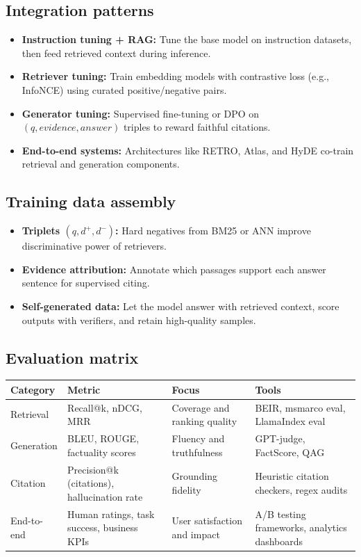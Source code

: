 \documentclass{article}
\begin{document}
\subsection{Integration patterns}
\begin{itemize}
  \item \textbf{Instruction tuning + RAG:} Tune the base model on instruction datasets, then feed retrieved context during inference.
  \item \textbf{Retriever tuning:} Train embedding models with contrastive loss (e.g., InfoNCE) using curated positive/negative pairs.
  \item \textbf{Generator tuning:} Supervised fine-tuning or DPO on $(q, evidence, answer)$ triples to reward faithful citations.
  \item \textbf{End-to-end systems:} Architectures like RETRO, Atlas, and HyDE co-train retrieval and generation components.
\end{itemize}

\subsection{Training data assembly}
\begin{itemize}
  \item \textbf{Triplets $(q, d^+, d^-)$:} Hard negatives from BM25 or ANN improve discriminative power of retrievers.
  \item \textbf{Evidence attribution:} Annotate which passages support each answer sentence for supervised citing.
  \item \textbf{Self-generated data:} Let the model answer with retrieved context, score outputs with verifiers, and retain high-quality samples.
\end{itemize}

\subsection{Evaluation matrix}
\begin{longtable}{p{3cm}p{3cm}p{4cm}p{4cm}}
\toprule
Category & Metric & Focus & Tools \\
\midrule
Retrieval & Recall@k, nDCG, MRR & Coverage and ranking quality & BEIR, msmarco eval, LlamaIndex eval \\
Generation & BLEU, ROUGE, factuality scores & Fluency and truthfulness & GPT-judge, FactScore, QAG \\
Citation & Precision@k (citations), hallucination rate & Grounding fidelity & Heuristic citation checkers, regex audits \\
End-to-end & Human ratings, task success, business KPIs & User satisfaction and impact & A/B testing frameworks, analytics dashboards \\
\bottomrule
\end{longtable}
\end{document}

